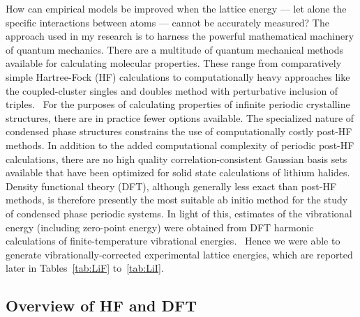 \documentclass[titlepage,11pt]{article}
\begin{document}
How can empirical models be improved when the lattice energy --- let alone the specific interactions between atoms --- cannot be accurately measured? The approach used in my research is to harness the powerful mathematical machinery of
quantum mechanics. There are a multitude of quantum mechanical methods available for calculating molecular properties. These range from comparatively simple Hartree-Fock (HF) calculations to computationally heavy approaches like the coupled-cluster singles and doubles method with perturbative inclusion of triples.~\cite{szabo2012modern} For the purposes of calculating properties of infinite periodic crystalline structures, there are in practice fewer options available. The specialized nature of condensed phase structures constrains the use of computationally costly post-HF methods. In addition to the added computational complexity of periodic post-HF calculations, there are no high quality correlation-consistent Gaussian basis sets available that have been optimized for solid state calculations of lithium halides. Density functional theory (DFT), although generally less exact than post-HF methods, is therefore presently the most suitable ab initio method for the study of condensed phase periodic systems. In light of this, estimates of the vibrational energy (including zero-point energy) were obtained from DFT harmonic calculations of finite-temperature vibrational energies.~\cite{pascale2004calculation,zicovich2004calculation} Hence we were able to generate vibrationally-corrected experimental lattice energies, which are reported later in Tables~\ref{tab:LiF} to~\ref{tab:LiI}.

\subsection{Overview of HF and DFT}
\end{document}
